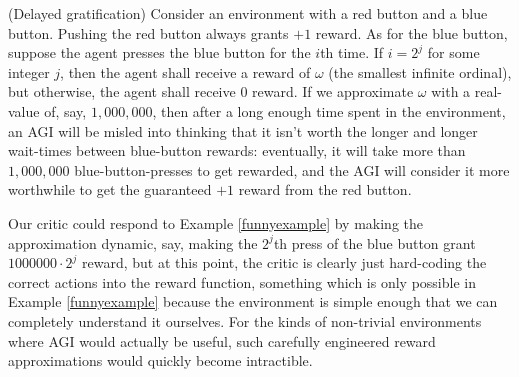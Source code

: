 \documentclass[twoside,11pt]{article}
\begin{document}
\begin{example}
\label{funnyexample}
(Delayed gratification)
Consider an environment with a red button and a blue button.
Pushing the red button always grants $+1$ reward.
As for the blue button, suppose the agent presses the blue button for the
$i$th time. If $i=2^j$ for some integer $j$, then the agent shall receive a
reward of $\omega$ (the smallest infinite ordinal), but otherwise, the agent
shall receive $0$ reward.
If we approximate $\omega$ with a real-value of, say, $1,000,000$,
then after a long enough time spent in the environment, an AGI will be misled into
thinking that it isn't worth the longer and longer wait-times between blue-button
rewards: eventually, it will take more than $1,000,000$ blue-button-presses to get
rewarded, and the AGI will consider it more worthwhile to get the guaranteed $+1$
reward from the red button.
\end{example}

Our critic could respond to Example \ref{funnyexample}
by making the approximation dynamic, say, making the
$2^j$th press of the blue button grant $1000000\cdot 2^j$ reward, but at this point,
the critic is clearly just hard-coding the correct actions into the reward function,
something which is only possible in Example \ref{funnyexample} because the environment
is simple enough that we can completely understand it ourselves. For the
kinds of non-trivial environments where AGI would actually be useful, such carefully
engineered reward approximations would quickly become intractible.

\end{document}
